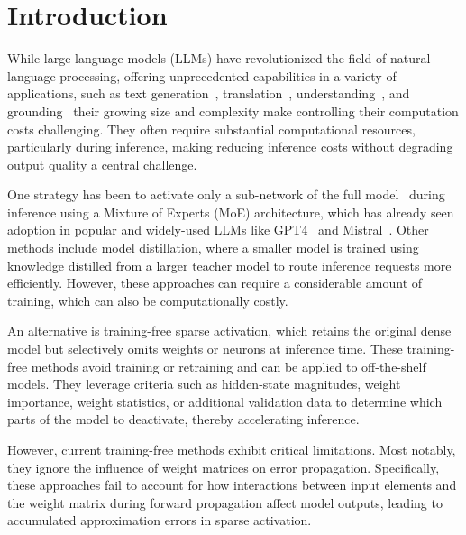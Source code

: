 \section{Introduction}

While large language models (LLMs) have revolutionized the field of natural language processing, offering unprecedented capabilities in a variety of applications, such as text generation~\citep{li2024pre,cheng2025dehumanizing}, translation~\citep{hendy2023goodgptmodelsmachine,seamless2025joint},  understanding~\citep{chang2024survey,tschannen2025siglip}, and grounding~\citep{zhao2025robustness,hui2025winclick} their growing size and complexity make controlling their computation costs challenging. They often require substantial computational resources, particularly during inference, making reducing inference costs without degrading output quality a central challenge.

One strategy has been to activate only a sub-network of the full model~\citep{jacobs1991adaptive} during inference using a Mixture of Experts (MoE) architecture, which has already seen adoption in popular and widely-used LLMs like GPT4~\citep{achiam2023gpt} and Mistral~\citep{jiang2023mistral}. Other methods include model distillation, where a smaller model is trained using knowledge distilled from a larger teacher model to route inference requests more efficiently. However, these approaches can require a considerable amount of training, which can also be computationally costly.

An alternative is training-free sparse activation, which retains the original dense model but selectively omits weights or neurons at inference time. These training-free methods avoid training or retraining and can be applied to off-the-shelf models. They leverage criteria such as hidden-state magnitudes, weight importance, weight statistics, or additional validation data to determine which parts of the model to deactivate, thereby accelerating inference.



However, current training-free methods exhibit critical limitations. Most notably, they ignore the influence of weight matrices on error propagation. Specifically, these approaches fail to account for how interactions between input elements and the weight matrix during forward propagation affect model outputs, leading to accumulated approximation errors in sparse activation.

